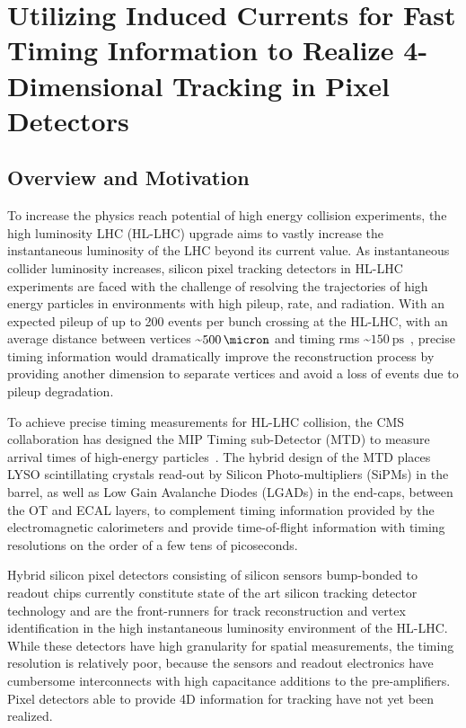 
\chapter{Utilizing Induced Currents for Fast Timing Information to Realize 4-Dimensional Tracking in Pixel Detectors}

\section{Overview and Motivation}
To increase the physics reach potential of high energy collision experiments, the high luminosity LHC (HL-LHC) upgrade aims to vastly increase the instantaneous luminosity of the LHC beyond its current value. 
As instantaneous collider luminosity increases, silicon pixel tracking detectors in HL-LHC experiments are faced with the challenge of resolving the trajectories of high energy particles in environments with high pileup, rate, and radiation.
With an expected pileup of up to 200 events per bunch crossing at the HL-LHC, with an average distance between vertices \sim$\SI{500}{\micron}$ and timing rms \sim$\SI{150}{\ps}$~\cite{CARTIGLIA201747}, precise timing information would dramatically improve the reconstruction process by providing another dimension to separate vertices and avoid a loss of events due to pileup degradation.

To achieve precise timing measurements for HL-LHC collision, the CMS collaboration has designed the MIP Timing sub-Detector (MTD) to measure arrival times of high-energy particles~\cite{CMS:2667167}.
The hybrid design of the MTD places LYSO scintillating crystals read-out by Silicon Photo-multipliers (SiPMs) in the barrel, as well as Low Gain Avalanche Diodes (LGADs) in the end-caps, between the OT and ECAL layers, to complement timing information provided by the electromagnetic calorimeters and provide time-of-flight information with timing resolutions on the order of a few tens of picoseconds.

Hybrid silicon pixel detectors consisting of silicon sensors bump-bonded to readout chips currently constitute state of the art silicon tracking detector technology and are the front-runners for track reconstruction and vertex identification in the high instantaneous luminosity environment of the HL-LHC.
While these detectors have high granularity for spatial measurements, the timing resolution is relatively poor, because the sensors and readout electronics have cumbersome interconnects with high capacitance additions to the pre-amplifiers. 
Pixel detectors able to provide 4D information for tracking have not yet been realized.

